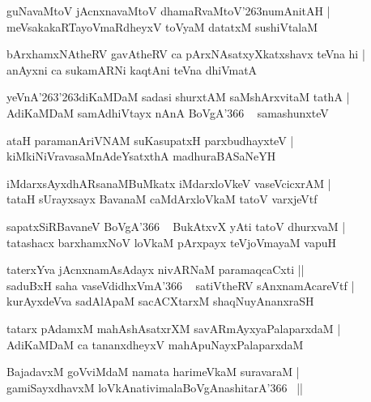 \documentclass[twoside,12pt,openright]{book}
\def\S{\char'263}
\newcounter{shloka}[chapter]
\begin{document}
\begin{shloka}
guNavaMtoV jAcnxnavaMtoV dhamaRvaMtoV\S numAnitAH |\\
meVsakakaRTayoVmaRdheyxV toVyaM datatxM sushiVtalaM 
\end{shloka}

\begin{shloka}
bArxhamxNAtheRV gavAtheRV ca pArxNAsatxyXkatxshavx teVna hi |\\%
anAyxni ca sukamARNi kaqtAni teVna dhiVmatA 
\end{shloka}

\begin{shloka}
yeVnA\S\S diKaMDaM sadasi shurxtAM saMshArxvitaM tathA |\\%
AdiKaMDaM samAdhiVtayx nAnA BoVgA\char'366 ~ samashunxteV
\end{shloka}

\begin{shloka}
ataH paramanAriVNAM suKasupatxH parxbudhayxteV |\\%
kiMkiNiVravasaMnAdeYsatxthA madhuraBASaNeYH 
\end{shloka}

\begin{shloka}
iMdarxsAyxdhARsanaMBuMkatx iMdarxloVkeV vaseVcicxrAM |\\%
tataH sUrayxsayx BavanaM caMdArxloVkaM tatoV varxjeVtf 
\end{shloka}

\begin{shloka}
sapatxSiRBavaneV BoVgA\char'366 ~ BukAtxvX yAti tatoV dhurxvaM |\\%
tatashacx barxhamxNoV loVkaM pArxpayx teVjoVmayaM vapuH  
\end{shloka}

\begin{shloka}
taterxYva jAcnxnamAsAdayx nivARNaM paramaqcaCxti ||\\%
saduBxH saha vaseVdidhxVmA\char'366 ~ satiVtheRV sAnxnamAcareVtf |\\
kurAyxdeVva sadAlApaM sacACXtarxM shaqNuyAnanxraSH 
\end{shloka}

\begin{shloka}
tatarx pAdamxM mahAshAsatxrXM  savARmAyxyaPalaparxdaM |\\%
AdiKaMDaM ca tananxdheyxV mahApuNayxPalaparxdaM 
\end{shloka}

\begin{shloka}
BajadavxM goVviMdaM namata harimeVkaM suravaraM |\\%
gamiSayxdhavxM loVkAnativimalaBoVgAnashitarA\char'366 ~||
\end{shloka}
\end{document}
